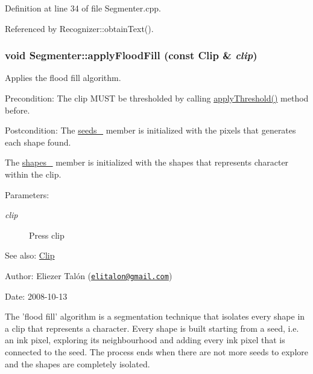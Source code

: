 Definition at line 34 of file Segmenter.cpp.

Referenced by Recognizer::obtainText().\hypertarget{class_segmenter_327c88f2d55cb606a67ce778c06cf426}{
\subsubsection[applyFloodFill]{\setlength{\rightskip}{0pt plus 5cm}void Segmenter::applyFloodFill (const {\bf Clip} \& {\em clip})}}
\label{class_segmenter_327c88f2d55cb606a67ce778c06cf426}


Applies the flood fill algorithm. 

\begin{Desc}
\item[Precondition:]The clip MUST be thresholded by calling \hyperlink{class_segmenter_6854315e3320f9d9a8ece14cbb8570ee}{applyThreshold()} method before.\end{Desc}
\begin{Desc}
\item[Postcondition:]The \hyperlink{class_segmenter_48b7c2c842b26bebda9d0fc13cf81e58}{seeds\_\-} member is initialized with the pixels that generates each shape found. 

The \hyperlink{class_segmenter_3040cc000907ef44e820ddcf70de6f08}{shapes\_\-} member is initialized with the shapes that represents character within the clip.\end{Desc}
\begin{Desc}
\item[Parameters:]
\begin{description}
\item[{\em clip}]Press clip\end{description}
\end{Desc}
\begin{Desc}
\item[See also:]\hyperlink{class_clip}{Clip}\end{Desc}
\begin{Desc}
\item[Author:]Eliezer Talón (\href{mailto:elitalon@gmail.com}{\tt elitalon@gmail.com}) \end{Desc}
\begin{Desc}
\item[Date:]2008-10-13\end{Desc}
The 'flood fill' algorithm is a segmentation technique that isolates every shape in a clip that represents a character. Every shape is built starting from a seed, i.e. an ink pixel, exploring its neighbourhood and adding every ink pixel that is connected to the seed. The process ends when there are not more seeds to explore and the shapes are completely isolated. 

